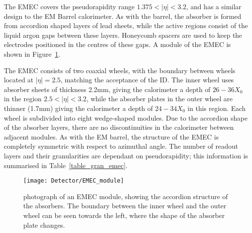 The EMEC covers the pseudorapidity range $1.375 < |\eta| < 3.2$, and has a similar design to the EM Barrel calorimeter. As with the barrel, the absorber is formed from accordion shaped layers of lead sheets, while the active regions consist of the liquid argon gaps between these layers. Honeycomb spacers are used to keep the electrodes positioned in the centres of these gaps. A module of the EMEC is shown in Figure~\ref{fig_EMEC_module}.

The EMEC consists of two coaxial wheels, with the boundary between wheels located at $|\eta| = 2.5$, matching the acceptance of the ID. The inner wheel uses absorber sheets of thickness 2.2mm, giving the calorimeter a depth of $26 - 36 X_0$ in the region $2.5 < | \eta| < 3.2 $, while the absorber plates in the outer wheel are thinner (1.7mm) giving the calorimeter a depth of $24 -34 X_0$ in this region. Each wheel is subdivided into eight wedge-shaped modules. Due to the accordion shape of the absorber layers, there are no discontinuities in the calorimeter between adjacent modules. As with the EM barrel, the structure of the EMEC is completely symmetric with respect to azimuthal angle. The number of readout layers and their granularities are dependant on pseudorapidity; this information is summarised in Table~\ref{table_gran_emec}. 

\begin{figure}[tb]
\begin{center}
\texttt{[image: Detector/EMEC\_module]}
\end{center}
\caption[Photograph of an EMEC module.]{photograph of an EMEC module, showing the accordion structure of the absorbers. The boundary between the inner wheel and the outer wheel can be seen towards the left, where the shape of the absorber plate changes.}
\label{fig_EMEC_module}
\end{figure}

